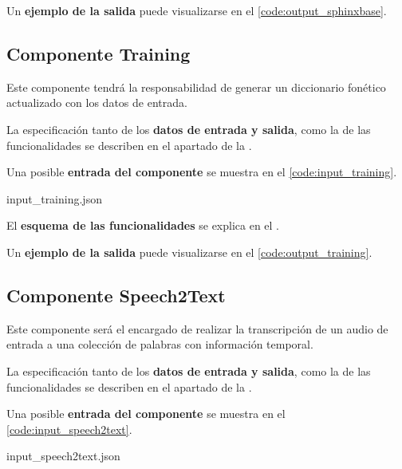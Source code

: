\documentclass[../main.tex]{subfiles}
\begin{document}
Un \textbf{ejemplo de la salida} puede visualizarse en el \autoref{code:output_sphinxbase}.



\subsection{Componente Training}\label{subsec:impl_training}
Este componente tendrá la responsabilidad de generar un diccionario fonético actualizado con los datos de entrada.

La especificación tanto de los \textbf{datos de entrada y salida}, como la de las funcionalidades se describen en el apartado  de la .

Una posible \textbf{entrada del componente} se muestra en el \autoref{code:input_training}.

                {input_training.json}
                
El \textbf{esquema de las funcionalidades} se explica en el .

Un \textbf{ejemplo de la salida} puede visualizarse en el \autoref{code:output_training}.



\subsection{Componente Speech2Text}\label{subsec:impl_speech2text}
Este componente será el encargado de realizar la transcripción de un audio de entrada a una colección de palabras con información temporal.

La especificación tanto de los \textbf{datos de entrada y salida}, como la de las funcionalidades se describen en el apartado  de la .

Una posible \textbf{entrada del componente} se muestra en el \autoref{code:input_speech2text}.

                {input_speech2text.json}
                
\end{document}
